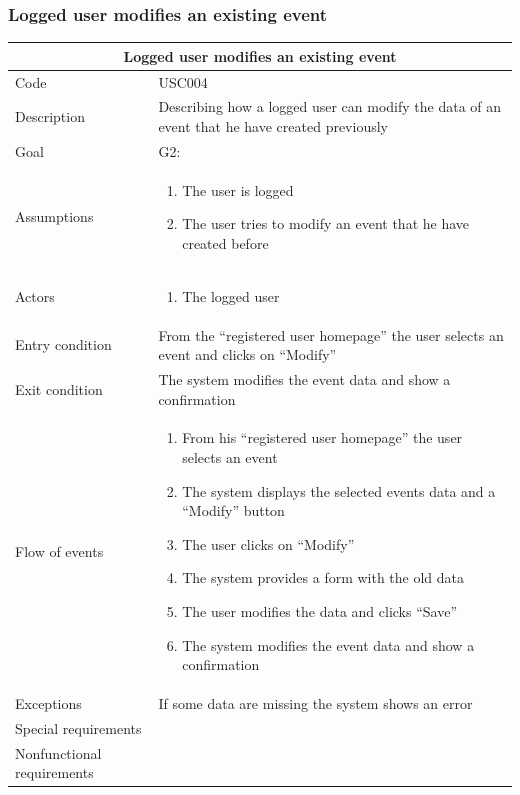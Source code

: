 \documentclass[10pt,a4paper,titlepage]{article}
\begin{document}
\clearpage
\subsubsection{Logged user modifies an existing event}

\begin{tabular}[h]{| p{3cm} | p{10cm} |}
\hline \multicolumn{2}{|c|}{\textbf{Logged user modifies an existing event}} \\ 
\hline Code & USC004 \\ 
\hline Description & Describing how a logged user can modify the data of an event that he have created previously \\
\hline Goal & G2: \\
\hline Assumptions  & \begin{enumerate}
\item The user is logged
\item The user tries to modify an event that he have created before
\end{enumerate} \\
\hline Actors &  \begin{enumerate}
\item The logged user
\end{enumerate} \\
\hline Entry condition & From the “registered user homepage” the user selects an event and clicks on “Modify” \\
\hline Exit condition & The system modifies the event data and show a confirmation \\
\hline Flow of events & \begin{enumerate}
\item From his “registered user homepage” the user selects an event
\item The system displays the selected events data and a “Modify” button
\item The user clicks on “Modify”
\item The system provides a form with the old data
\item The user modifies the data and clicks “Save”
\item The system modifies the event data and show a confirmation
\end{enumerate}\\
\hline Exceptions & If some data are missing the system shows an error \\
\hline Special requirements & \\
\hline Nonfunctional requirements &  \\
\hline
\end{tabular}
\end{document}
